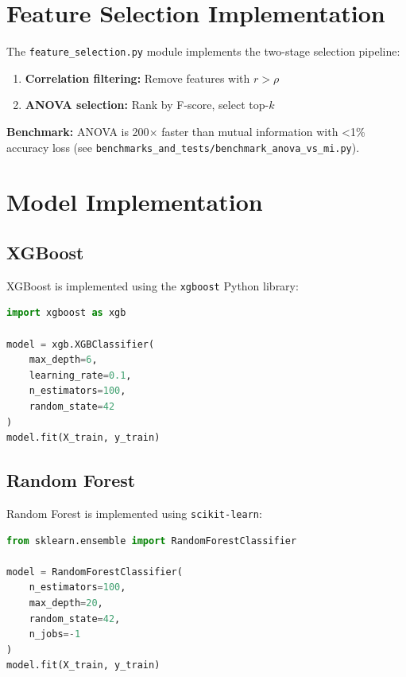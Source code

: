 \section{Feature Selection Implementation}
\label{sec:feature_selection_impl}

The \texttt{feature\_selection.py} module implements the two-stage selection pipeline:

\begin{enumerate}
    \item \textbf{Correlation filtering:} Remove features with $r > \rho$
    \item \textbf{ANOVA selection:} Rank by F-score, select top-$k$
\end{enumerate}

\textbf{Benchmark:} ANOVA is 200$\times$ faster than mutual information with <1\% accuracy loss (see \texttt{benchmarks\_and\_tests/benchmark\_anova\_vs\_mi.py}).

\section{Model Implementation}
\label{sec:model_impl}

\subsection{XGBoost}
\label{subsec:xgboost_impl}

XGBoost is implemented using the \texttt{xgboost} Python library:

\begin{lstlisting}[language=Python]
import xgboost as xgb

model = xgb.XGBClassifier(
    max_depth=6,
    learning_rate=0.1,
    n_estimators=100,
    random_state=42
)
model.fit(X_train, y_train)
\end{lstlisting}

\subsection{Random Forest}
\label{subsec:rf_impl}

Random Forest is implemented using \texttt{scikit-learn}:

\begin{lstlisting}[language=Python]
from sklearn.ensemble import RandomForestClassifier

model = RandomForestClassifier(
    n_estimators=100,
    max_depth=20,
    random_state=42,
    n_jobs=-1
)
model.fit(X_train, y_train)
\end{lstlisting}

